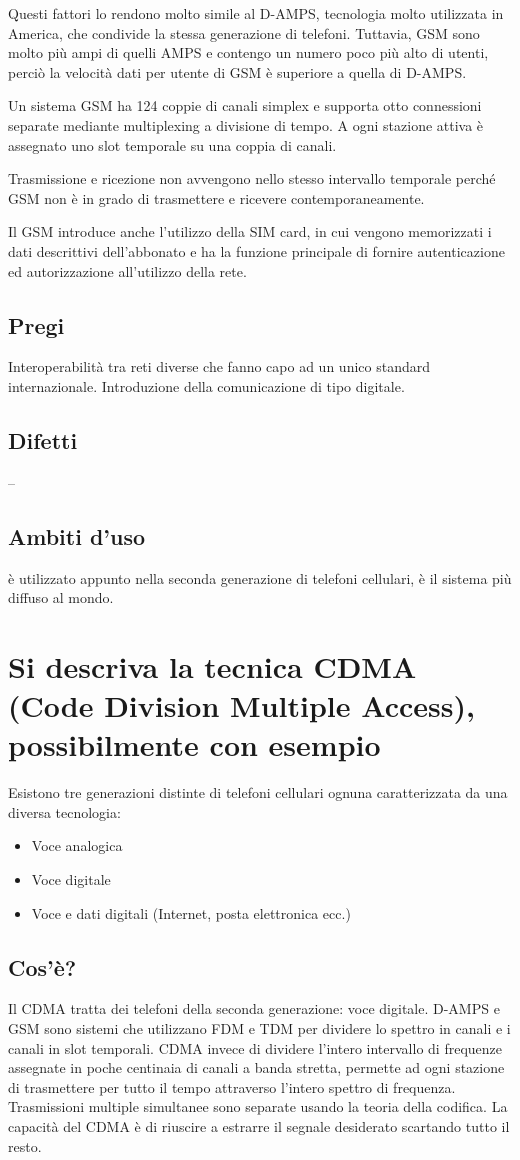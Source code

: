 Questi fattori lo rendono molto simile al D-AMPS, tecnologia molto utilizzata in America, che condivide la stessa generazione di telefoni. Tuttavia, GSM sono molto più ampi di quelli AMPS e contengo un numero poco più alto di utenti, perciò la velocità dati per utente di GSM è superiore a quella di D-AMPS.

Un sistema GSM ha 124 coppie di canali simplex e supporta otto connessioni separate mediante multiplexing a divisione di tempo.
A ogni stazione attiva è assegnato uno slot temporale su una coppia di canali.

Trasmissione e ricezione non avvengono nello stesso intervallo temporale perché GSM non è in grado di trasmettere e ricevere contemporaneamente.

Il GSM introduce anche l'utilizzo della SIM card, in cui vengono memorizzati i dati descrittivi dell'abbonato e ha la funzione principale di fornire autenticazione ed autorizzazione all'utilizzo della rete.

\subsection{Pregi}
Interoperabilità tra reti diverse che fanno capo ad un unico standard internazionale.
Introduzione della comunicazione di tipo digitale.
\subsection{Difetti}
--
\subsection{Ambiti d'uso}
è utilizzato appunto nella seconda generazione di telefoni cellulari, è il sistema più diffuso al mondo.

\section{Si descriva la tecnica CDMA (Code Division Multiple Access), possibilmente con esempio}
Esistono tre generazioni distinte di telefoni cellulari ognuna caratterizzata da una diversa tecnologia:
\begin{itemize}
\item	Voce analogica
\item	Voce digitale
\item	Voce e dati digitali (Internet, posta elettronica ecc.)
\end{itemize}
\subsection{Cos'è?}
Il CDMA tratta dei telefoni della seconda generazione: voce digitale.
D-AMPS e GSM sono sistemi che utilizzano FDM e TDM per dividere lo spettro in canali e i canali in slot temporali. CDMA invece di dividere l'intero intervallo di frequenze assegnate in poche centinaia di canali a banda stretta, permette ad ogni stazione di trasmettere per tutto il tempo attraverso l'intero spettro di frequenza. Trasmissioni multiple simultanee sono separate usando la teoria della codifica. La capacità del CDMA è di riuscire a estrarre il segnale desiderato scartando tutto il resto.

